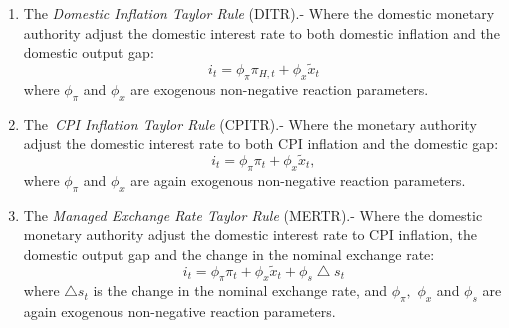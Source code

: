 \documentclass{article}
\begin{document}
\begin{enumerate}
\item The \textit{Domestic Inflation Taylor Rule} (DITR).- Where the
domestic monetary authority adjust the domestic interest rate to both
domestic inflation and the domestic output gap:%
\begin{equation}
i_{t}=\phi _{\pi }\pi _{H,t}+\phi _{x}\widetilde{x}_{t}  \label{DITR}
\end{equation}%
where $\phi _{\pi }$ and $\phi _{x}$ are exogenous non-negative reaction
parameters.

\item The\textit{\ CPI Inflation Taylor Rule} (CPITR).- Where the monetary
authority adjust the domestic interest rate to both CPI inflation and the
domestic gap:%
\begin{equation}
i_{t}=\phi _{\pi }\pi _{t}+\phi _{x}\widetilde{x}_{t},  \label{CPITR}
\end{equation}%
where $\phi _{\pi }$ and $\phi _{x}$ are again exogenous non-negative
reaction parameters.

\item The \textit{Managed Exchange Rate Taylor Rule} (MERTR).- Where the
domestic monetary authority adjust the domestic interest rate to CPI
inflation, the domestic output gap and the change in the nominal exchange
rate:%
\begin{equation}
i_{t}=\phi _{\pi }\pi _{t}+\phi _{x}\widetilde{x}_{t}+\phi
_{s}\bigtriangleup s_{t}  \label{MERTR}
\end{equation}%
where $\bigtriangleup s_{t}$ is the change in the nominal exchange rate, and 
$\phi _{\pi },$ $\phi _{x}$ and $\phi _{s}$ are again exogenous non-negative
reaction parameters.


\end{enumerate}
\end{document}
